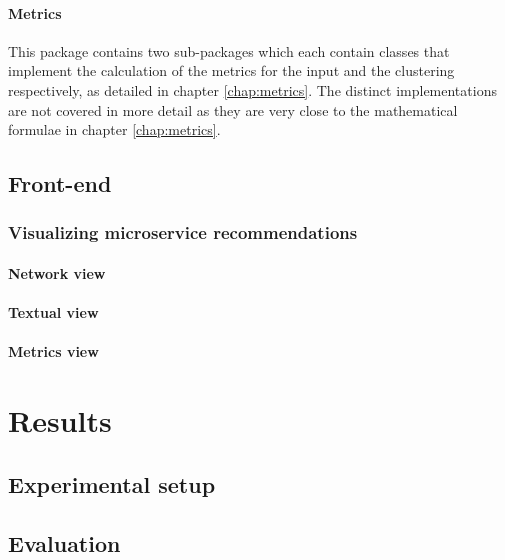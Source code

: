 \documentclass[12pt,a4paper]{report}
\begin{document}
\subsubsection{Metrics}
This package contains two sub-packages which each contain classes that implement
the calculation of the metrics for the input and the clustering respectively,
as detailed in chapter \ref{chap:metrics}.
The distinct implementations are not covered in more detail as they are very
close to the mathematical formulae in chapter \ref{chap:metrics}.



\section{Front-end} \label{sect:implementation-front-end}




\subsection{Visualizing microservice recommendations}

\subsubsection{Network view}



\subsubsection{Textual view}



\subsubsection{Metrics view}





\chapter{Results} \label{chap:results}

\section{Experimental setup}

\section{Evaluation}
\end{document}
